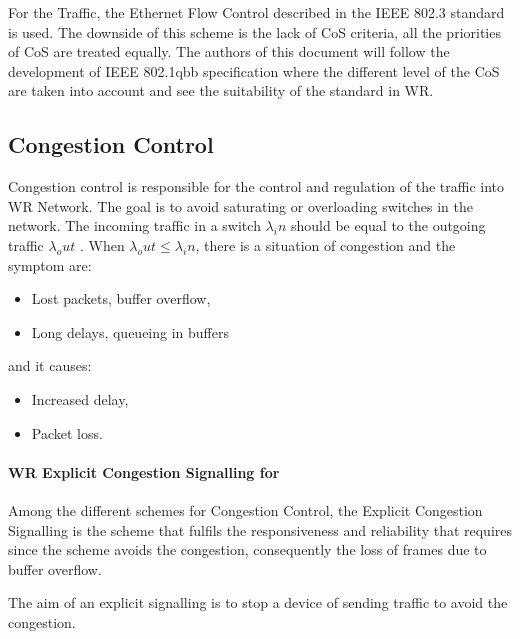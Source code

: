 For the \SP Traffic, the Ethernet Flow Control described in the IEEE 802.3
\cite{IEEE8023} standard is used. The downside of this scheme is the lack of CoS
criteria, all the priorities of CoS are treated equally.  The authors of
this document will follow the development of IEEE 802.1qbb \cite{IEEE8021Qbb}
specification where the different level of the CoS are taken into account and
see the suitability of the standard in WR. 

\vspace{10 mm}

\subsection{Congestion Control}

Congestion control is responsible for the control and regulation of the traffic 
into WR Network. The goal is to avoid saturating or overloading switches
in the network. The incoming traffic in a switch $\lambda_in$ should be equal to
the outgoing traffic $\lambda_out$ . When $\lambda_out \leq \lambda_in$, there
is a situation of congestion and the symptom are:
\begin{itemize}
	\item Lost packets, buffer overflow,
	\item Long delays, queueing in buffers
\end{itemize}

\noindent and it causes:

\begin{itemize}
	\item Increased delay,
	\item Packet loss.
\end{itemize}

\paragraph{WR Explicit Congestion Signalling for \HP}

Among the different schemes for Congestion Control, the Explicit Congestion 
Signalling is the scheme that fulfils the responsiveness and reliability
that \HP requires since the scheme avoids the congestion, consequently the loss
of frames due to buffer overflow.

The aim of an explicit signalling is to stop a device of sending traffic to
avoid the congestion. 


